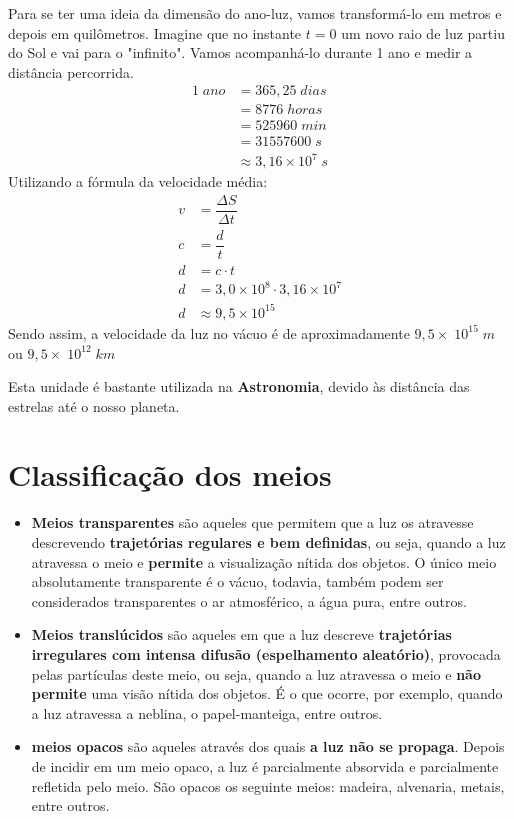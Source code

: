 \documentclass[11pt,twocolumn,oneside]{article}
\begin{document}
Para se ter uma ideia da dimensão do ano-luz, vamos transformá-lo em metros e depois em quilômetros. Imagine que no instante $t=0$ um novo raio de luz partiu do Sol e vai para o "infinito". Vamos acompanhá-lo durante 1 ano e medir a distância percorrida.
\begin{align*}
    1\;ano  &= 365,25\;dias \\
            &= 8776\;horas \\
            &= 525960\;min \\
            &= 31557600\;s \\
            &\approx 3,16\times 10^{7}\;s
\end{align*}
Utilizando a fórmula da velocidade média:
\begin{align*}
    v &= \dfrac{\Delta S}{\Delta t} \\
    c &= \dfrac{d}{t} \\
    d &= c \cdot t \\
    d &= 3,0\times 10^{8} \cdot 3,16\times 10^{7} \\
    d &\approx 9,5 \times 10^{15}
\end{align*}
Sendo assim, a velocidade da luz no vácuo é de aproximadamente $9,5 \times\;10^{15}\;m$ ou $9,5 \times\;10^{12}\;km$


Esta unidade é bastante utilizada na \textbf{Astronomia}, devido às distância das estrelas até o nosso planeta.


\hypertarget{x-classificação-dos-meios}{\section{Classificação dos meios}}
\begin{itemize}

\item \textbf{Meios transparentes} são aqueles que permitem que a luz os atravesse descrevendo \textbf{trajetórias regulares e bem definidas}, ou seja, quando a luz atravessa o meio  e \textbf{permite} a visualização nítida dos objetos. O único meio absolutamente transparente é o vácuo, todavia, também podem ser considerados transparentes o ar atmosférico, a água pura, entre outros.

\item \textbf{Meios translúcidos} são aqueles em que a luz descreve \textbf{trajetórias irregulares com intensa difusão (espelhamento aleatório)}, provocada pelas partículas deste meio, ou seja, quando a luz atravessa o meio e \textbf{não permite} uma visão nítida dos objetos. É o que ocorre, por exemplo, quando a luz atravessa a neblina, o papel-manteiga, entre outros.

\item \textbf{meios opacos} são aqueles através dos quais \textbf{a luz não se propaga}. Depois de incidir em um meio opaco, a luz é parcialmente absorvida e parcialmente refletida pelo meio. São opacos os seguinte meios: madeira, alvenaria, metais, entre outros.

\end{itemize}
\end{document}
